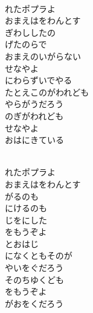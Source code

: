 \documentclass[10pt,b5j]{tarticle} %
\begin{document}
\vspace{1.5em} %
\newcommand{\linespace}{0.5em} %
\newcommand{\blocksize}{0.5\hsize} %
\newcommand{\itemmargin}{6em} %
\begin{enumerate} %
    \setlength{\itemindent}{\itemmargin} %
    \begin{minipage}[c]{\blocksize}
    
        \vspace{\linespace}
        \item~\\
        れたポプラよ\\
        おまえはをわんとす\\
        ぎわししたの\\
        げたのらで\\
        おまえのいがらない\\
        せなやよ\\
        にわらずいでやる\\
        たとえこのがわれども\\
        やらがうだろう\\
        のぎがわれども\\
        せなやよ\\
        おはにきている
        
        \vspace{\linespace}
        \item~\\
        れたポプラよ\\
        おまえはをわんとす\\
        がるのも\\
        にけるのも\\
        じをにした\\
        をもうぞよ\\
        とおはじ\\
        になくともそのが\\
        やいをぐだろう\\
        そのちゆくども\\
        をもうぞよ\\
        がおをくだろう
        

\end{minipage}
\end{enumerate}
\end{document}
